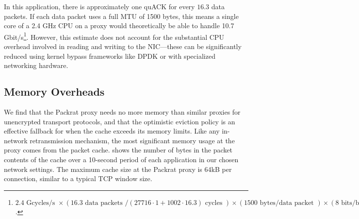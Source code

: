 

In this application, there is approximately one quACK for every $16.3$ data
packets. If each data packet uses a full MTU of 1500 bytes, this means a single
core of a 2.4 GHz CPU on a proxy would theoretically be able to handle 10.7
Gbit/s\footnote{ $2.4\text{ Gcycles/s }
\times(16.3 \text{ data packets } / (27716\cdot1 + 1002\cdot16.3) \text{ cycles })
\times (1500 \text{ bytes/data packet })
\times (8 \text{ bits/byte })
= 10.7 \text{ Gbit/s}$.
}. However, this estimate does not account for the substantial CPU overhead
involved in reading and writing to the NIC---these can be significantly reduced
using kernel bypass frameworks like DPDK or with specialized networking
hardware.



\subsection{Memory Overheads}
\label{sec:packrat:evaluation:memory-overheads}



We find that the Packrat proxy needs no more memory
than similar proxies for unencrypted transport protocols, and that the optimistic
eviction policy is an effective fallback for when the cache exceeds its memory limits.
Like any in-network retransmission mechanism,
the most significant memory usage at the proxy comes from the packet
cache.  shows the number of bytes in the packet contents of
the cache over a 10-second period of each application in our chosen
network settings. The maximum cache size
at the Packrat proxy is 64kB per connection, similar to a typical TCP window size.

